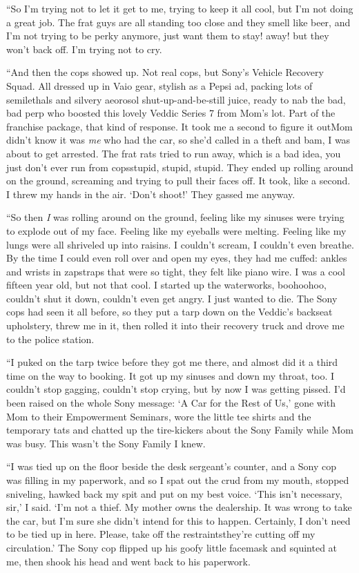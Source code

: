 “So I’m trying not to let it get to me, trying to keep it all cool,
but I’m not doing a great job. The frat guys are all standing too
close and they smell like beer, and I’m not trying to be perky
anymore, just want them to stay! away! but they won’t back off. I’m
trying not to cry.

“And then the cops showed up. Not real cops, but Sony’s Vehicle
Recovery Squad. All dressed up in Vaio gear, stylish as a Pepsi ad,
packing lots of semilethals and silvery aeorosol
shut-up-and-be-still juice, ready to nab the bad, bad perp who
boosted this lovely Veddic Series 7 from Mom’s lot. Part of the
franchise package, that kind of response. It took me a second to
figure it out{\dash}Mom didn’t know it was \emph{me} who had the car, so
she’d called in a theft and bam, I was about to get arrested. The
frat rats tried to run away, which is a bad idea, you just don’t
ever run from cops{\dash}stupid, stupid, stupid. They ended up rolling
around on the ground, screaming and trying to pull their faces off.
It took, like a second. I threw my hands in the air. ‘Don’t shoot!’
They gassed me anyway.

“So then \emph{I} was rolling around on the ground, feeling like my
sinuses were trying to explode out of my face. Feeling like my
eyeballs were melting. Feeling like my lungs were all shriveled up
into raisins. I couldn’t scream, I couldn’t even breathe. By the
time I could even roll over and open my eyes, they had me cuffed:
ankles and wrists in zapstraps that were so tight, they felt like
piano wire. I was a cool fifteen year old, but not that cool. I
started up the waterworks, boohoohoo, couldn’t shut it down,
couldn’t even get angry. I just wanted to die. The Sony cops had
seen it all before, so they put a tarp down on the Veddic’s
backseat upholstery, threw me in it, then rolled it into their
recovery truck and drove me to the police station.

“I puked on the tarp twice before they got me there, and almost did
it a third time on the way to booking. It got up my sinuses and
down my throat, too. I couldn’t stop gagging, couldn’t stop crying,
but by now I was getting pissed. I’d been raised on the whole Sony
message: ‘A Car for the Rest of Us,’ gone with Mom to their
Empowerment Seminars, wore the little tee shirts and the temporary
tats and chatted up the tire-kickers about the Sony Family while
Mom was busy. This wasn’t the Sony Family I knew.

“I was tied up on the floor beside the desk sergeant’s counter, and
a Sony cop was filling in my paperwork, and so I spat out the crud
from my mouth, stopped sniveling, hawked back my spit and put on my
best voice. ‘This isn’t necessary, sir,’ I said. ‘I’m not a thief.
My mother owns the dealership. It was wrong to take the car, but
I’m sure she didn’t intend for this to happen. Certainly, I don’t
need to be tied up in here. Please, take off the restraints{\dash}they’re
cutting off my circulation.’ The Sony cop flipped up his goofy
little facemask and squinted at me, then shook his head and went
back to his paperwork.

